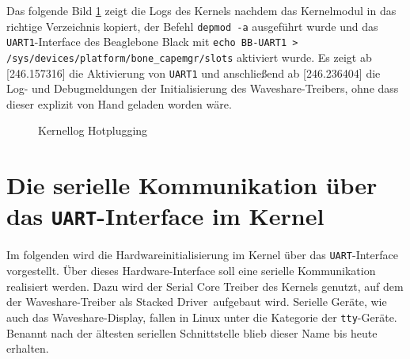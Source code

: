 Das folgende Bild \ref{pic:hotplugging} zeigt die Logs des Kernels nachdem das Kernelmodul in das richtige Verzeichnis kopiert, der Befehl \texttt{depmod -a} ausgeführt wurde und das \texttt{UART1}-Interface des Beaglebone Black mit \texttt{echo BB-UART1 > /sys/devices/platform/bone\_capemgr/slots} aktiviert wurde. Es zeigt ab [246.157316] die Aktivierung von \texttt{UART1} und anschließend ab [246.236404] die Log- und Debugmeldungen der Initialisierung des Waveshare-Treibers, ohne dass dieser explizit von Hand geladen worden wäre.


\begin{figure}[H]
  \centering
  \caption{Kernellog Hotplugging}
  \label{pic:hotplugging}
\end{figure}


\section{Die serielle Kommunikation über das \texttt{UART}-Interface im Kernel} %
Im folgenden wird die Hardwareinitialisierung im Kernel über das \texttt{UART}-Interface vorgestellt. Über dieses Hardware-Interface soll eine serielle Kommunikation realisiert werden. Dazu wird der Serial Core Treiber des Kernels genutzt, auf dem der Waveshare-Treiber als \glqq Stacked Driver\grqq~aufgebaut wird. Serielle Geräte, wie auch das Waveshare-Display, fallen in Linux unter die Kategorie der \texttt{tty}-Geräte. Benannt nach der ältesten seriellen Schnittstelle blieb dieser Name bis heute erhalten. \\ %

